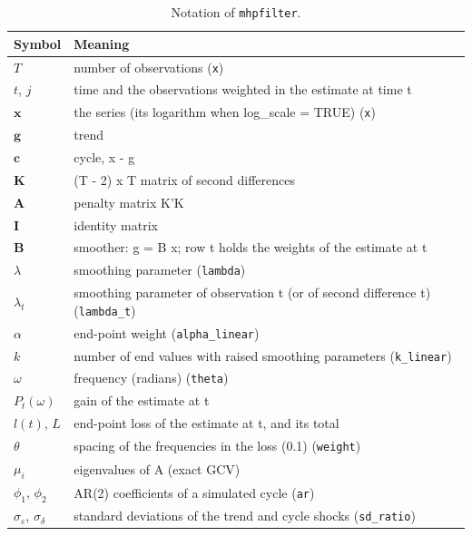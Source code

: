 \begin{longtable}{>{\raggedright\arraybackslash}p{}>{\raggedright\arraybackslash}p{}}
\caption{Notation of \texttt{mhpfilter}.}\\
\toprule
Symbol & Meaning\\
\midrule
\endhead
$T$ & number of observations (\texttt{x})\\
$t$, $j$ & time and the observations weighted in the estimate at time t\\
$\mathbf{x}$ & the series (its logarithm when log_scale = TRUE) (\texttt{x})\\
$\mathbf{g}$ & trend\\
$\mathbf{c}$ & cycle, x - g\\
$\mathbf{K}$ & (T - 2) x T matrix of second differences\\
$\mathbf{A}$ & penalty matrix K'K\\
$\mathbf{I}$ & identity matrix\\
$\mathbf{B}$ & smoother: g = B x; row t holds the weights of the estimate at t\\
$\lambda$ & smoothing parameter (\texttt{lambda})\\
$\lambda_t$ & smoothing parameter of observation t (or of second difference t) (\texttt{lambda\_t})\\
$\alpha$ & end-point weight (\texttt{alpha\_linear})\\
$k$ & number of end values with raised smoothing parameters (\texttt{k\_linear})\\
$\omega$ & frequency (radians) (\texttt{theta})\\
$P_t(\omega)$ & gain of the estimate at t\\
$l(t)$, $L$ & end-point loss of the estimate at t, and its total\\
$\theta$ & spacing of the frequencies in the loss (0.1) (\texttt{weight})\\
$\mu_i$ & eigenvalues of A (exact GCV)\\
$\phi_1$, $\phi_2$ & AR(2) coefficients of a simulated cycle (\texttt{ar})\\
$\sigma_\varepsilon$, $\sigma_\delta$ & standard deviations of the trend and cycle shocks (\texttt{sd\_ratio})\\
\bottomrule
\end{longtable}
